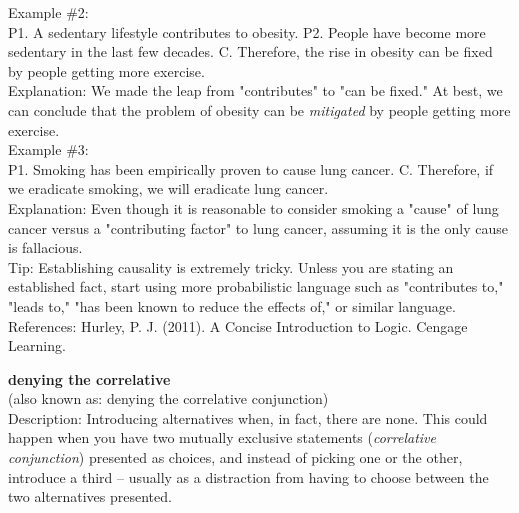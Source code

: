 \documentclass[a4paper,12pt,single,pdftex]{scrartcl}
\begin{document}
    
      Example \#2:
    \\

    
      P1. A sedentary lifestyle contributes to obesity. \newline
P2. People have become more sedentary in the last few decades. \newline
C. Therefore, the rise in obesity can be fixed by people getting more exercise.
    \\

    
      Explanation: We made the leap from "contributes" to "can be fixed." At best, we can conclude that the problem of obesity can be {\it mitigated}  by people getting more exercise.
    \\

    
      Example \#3:
    \\

    
      P1. Smoking has been empirically proven to cause lung cancer. \newline
C. Therefore, if we eradicate smoking, we will eradicate lung cancer.
    \\

    
      Explanation: Even though it is reasonable to consider smoking a "cause" of lung cancer versus a "contributing factor" to lung cancer, assuming it is the only cause is fallacious.
    \\

    
      Tip: Establishing causality is extremely tricky. Unless you are stating an established fact, start using more probabilistic language such as "contributes to," "leads to," "has been known to reduce the effects of," or similar language.
    \\

    References: Hurley, P. J. (2011). A Concise Introduction to Logic. Cengage Learning.
  
    
      {\bf denying the correlative}
    \\

  
    
      (also known as: denying the correlative conjunction)
    \\

  
    Description: Introducing alternatives when, in fact, there are none.  This could happen when you have two mutually exclusive statements ({\it correlative conjunction}) presented as choices, and instead of picking one or the other, introduce a third -- usually as  a distraction from having to choose between the two alternatives presented. 
\end{document}
